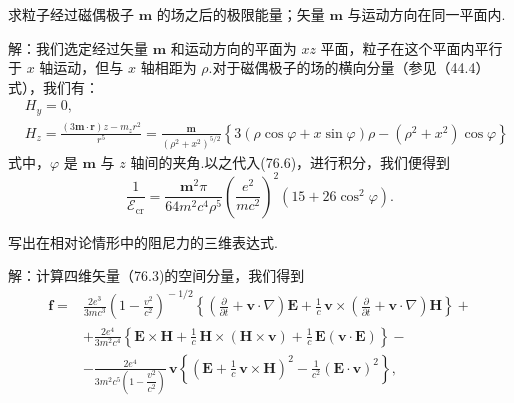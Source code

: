 \begin{xiti}

\quad 求粒子经过磁偶极子 $\boldsymbol{m}$ 的场之后的极限能量；矢量 $\boldsymbol{m}$ 与运动方向在同一平面内.

解：我们选定经过矢量 $\boldsymbol{m}$ 和运动方向的平面为 $xz$ 平面，粒子在这个平面内平行于 $x$ 轴运动，但与 $x$ 轴相距为 $\rho$.对于磁偶极子的场的横向分量（参见（44.4）式），我们有：
\begin{equation*}
\begin{aligned}
  &H_y=0,\\
  &H_z=\frac{(3\boldsymbol{m}\cdot\boldsymbol{r})z-m_zr^2}{r^5}
  =\frac{\boldsymbol{m}}{(\rho^2+x^2)^{5/2}}
  \left\{3(\rho\cos\varphi+x\sin\varphi)\rho-(\rho^2+x^2)\cos\varphi\right\}
\end{aligned}
\end{equation*}
式中，$\varphi$ 是 $\boldsymbol{m}$ 与 $z$ 轴间的夹角.以之代入(76.6)，进行积分，我们便得到
\begin{equation*}
  \frac{1}{\mathcal{E}_{\mathrm{cr}}}
  =\frac{\boldsymbol{m}^2\pi}{64m^2c^4\rho^5}
  \left(\frac{e^2}{mc^2}\right)^{\!2}(15+26\cos^2\varphi).
\end{equation*}

\quad 写出在相对论情形中的阻尼力的三维表达式.

解：计算四维矢量（76.3)的空间分量，我们得到
\begin{equation*}
\begin{aligned}
  \boldsymbol{f}={}&\frac{2e^3}{3mc^3}\left(1-\frac{v^2}{c^2}\right)^{\!-1/2}
  \left\{\left(\frac{\partial}{\partial t}+\boldsymbol{v}\cdot\nabla\right)\boldsymbol{E}
  +\frac{1}{c}\,\boldsymbol{v}\times\left(\frac{\partial}{\partial t}
  +\boldsymbol{v}\cdot\nabla\right)\boldsymbol{H}\right\}+\\
  &+\frac{2e^4}{3m^2c^4}\left\{\boldsymbol{E}\times\boldsymbol{H}
  +\frac{1}{c}\,\boldsymbol{H}\times(\boldsymbol{H}\times\boldsymbol{v})
  +\frac{1}{c}\,\boldsymbol{E}(\boldsymbol{v}\cdot\boldsymbol{E})\right\}-\\
  &-\frac{2e^4}{3m^2c^5\left(1-\dfrac{v^2}{c^2}\right)}\,\boldsymbol{v}
  \left\{\left(\boldsymbol{E}+\frac{1}{c}\,\boldsymbol{v}\times\boldsymbol{H}\right)^{\!2}
  -\frac{1}{c^2}(\boldsymbol{E}\cdot\boldsymbol{v})^2\right\},
\end{aligned}
\end{equation*}

\end{xiti}

